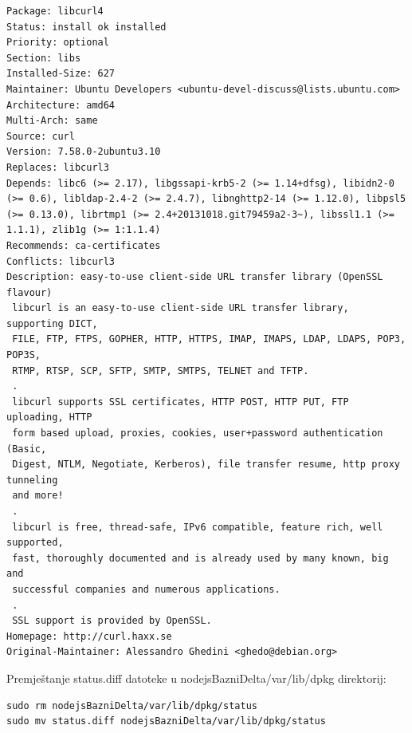\documentclass[12pt,vi]{mitthesis}
\begin{document}
\begin{lstlisting}[style=BashInputStyle]
Package: libcurl4
Status: install ok installed
Priority: optional
Section: libs
Installed-Size: 627
Maintainer: Ubuntu Developers <ubuntu-devel-discuss@lists.ubuntu.com>
Architecture: amd64
Multi-Arch: same
Source: curl
Version: 7.58.0-2ubuntu3.10
Replaces: libcurl3
Depends: libc6 (>= 2.17), libgssapi-krb5-2 (>= 1.14+dfsg), libidn2-0 (>= 0.6), libldap-2.4-2 (>= 2.4.7), libnghttp2-14 (>= 1.12.0), libpsl5 (>= 0.13.0), librtmp1 (>= 2.4+20131018.git79459a2-3~), libssl1.1 (>= 1.1.1), zlib1g (>= 1:1.1.4)
Recommends: ca-certificates
Conflicts: libcurl3
Description: easy-to-use client-side URL transfer library (OpenSSL flavour)
 libcurl is an easy-to-use client-side URL transfer library, supporting DICT,
 FILE, FTP, FTPS, GOPHER, HTTP, HTTPS, IMAP, IMAPS, LDAP, LDAPS, POP3, POP3S,
 RTMP, RTSP, SCP, SFTP, SMTP, SMTPS, TELNET and TFTP.
 .
 libcurl supports SSL certificates, HTTP POST, HTTP PUT, FTP uploading, HTTP
 form based upload, proxies, cookies, user+password authentication (Basic,
 Digest, NTLM, Negotiate, Kerberos), file transfer resume, http proxy tunneling
 and more!
 .
 libcurl is free, thread-safe, IPv6 compatible, feature rich, well supported,
 fast, thoroughly documented and is already used by many known, big and
 successful companies and numerous applications.
 .
 SSL support is provided by OpenSSL.
Homepage: http://curl.haxx.se
Original-Maintainer: Alessandro Ghedini <ghedo@debian.org>
\end{lstlisting}
\indent
Premještanje status.diff datoteke u nodejsBazniDelta/var/lib/dpkg direktorij:
\begin{lstlisting}[style=BashInputStyle]
sudo rm nodejsBazniDelta/var/lib/dpkg/status
sudo mv status.diff nodejsBazniDelta/var/lib/dpkg/status
\end{lstlisting}
\end{document}

